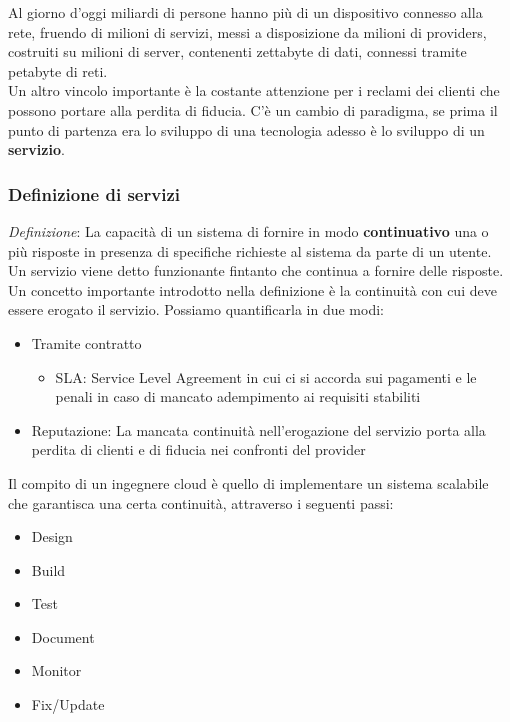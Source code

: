\documentclass{article}
\begin{document}
		Al giorno d'oggi miliardi di persone hanno più di un dispositivo connesso alla rete, fruendo di milioni di servizi, messi a disposizione da milioni di providers, costruiti su milioni di server, contenenti zettabyte di dati, connessi tramite petabyte di reti.\\
		
		Un altro vincolo importante è la costante attenzione per i reclami dei clienti che possono portare alla perdita di fiducia.
		C'è un cambio di paradigma, se prima il punto di partenza era lo sviluppo di una tecnologia adesso è lo sviluppo di un \textbf{servizio}.
		
		\subsubsection{Definizione di servizi}
		\emph{Definizione}: La capacità di un sistema di fornire in modo \textbf{continuativo} una o più risposte in presenza di specifiche richieste al sistema da parte di un utente.\\
		Un servizio viene detto funzionante fintanto che continua a fornire delle risposte.\\
		
		Un concetto importante introdotto nella definizione è la continuità con cui deve essere erogato il servizio. Possiamo quantificarla in due modi:
		
		\begin{itemize}
		    \item Tramite contratto
		    \begin{itemize}
		        \item SLA: Service Level Agreement in cui ci si accorda sui pagamenti e le penali in caso di mancato adempimento ai requisiti stabiliti
		    \end{itemize}
		    \item Reputazione: La mancata continuità nell'erogazione del servizio porta alla perdita di clienti e di fiducia nei confronti del provider
		\end{itemize}
		Il compito di un ingegnere cloud è quello di implementare un sistema scalabile che garantisca una certa continuità, attraverso i seguenti passi:
		
		\begin{itemize}
		    \item Design
		    \item Build
		    \item Test
		    \item Document
		    \item Monitor
		    \item Fix/Update
		\end{itemize}
		
\end{document}
